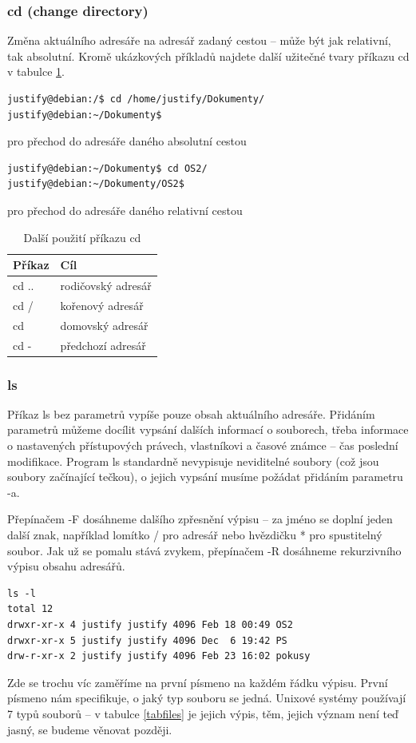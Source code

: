 \documentclass{article}
\begin{document}
\subsubsection{cd (change directory)}
Změna aktuálního adresáře na adresář zadaný cestou -- může být jak relativní, tak absolutní. Kromě ukázkových příkladů najdete další užitečné tvary příkazu cd v tabulce \ref{tabcd}.
\begin{verbatim}
justify@debian:/$ cd /home/justify/Dokumenty/
justify@debian:~/Dokumenty$
\end{verbatim}
pro přechod do adresáře daného absolutní cestou

\begin{verbatim}
justify@debian:~/Dokumenty$ cd OS2/
justify@debian:~/Dokumenty/OS2$
\end{verbatim}
pro přechod do adresáře daného relativní cestou
\begin{table}
\begin{center}
\begin{tabular}{l | l}
Příkaz & Cíl\\
\hline
cd .. & rodičovský adresář\\
cd / & kořenový adresář\\
cd & domovský adresář\\
cd - & předchozí adresář\\
\end{tabular}
\end{center}
\caption{Další použití příkazu cd}
\label{tabcd}
\end{table}

\subsubsection{ls}
Příkaz ls bez parametrů vypíše pouze obsah aktuálního adresáře. Přidáním parametrů můžeme docílit vypsání dalších informací o souborech, třeba informace o nastavených přístupových právech, vlastníkovi a časové známce -- čas poslední modifikace. Program ls standardně nevypisuje neviditelné soubory (což jsou soubory začínající tečkou), o jejich vypsání musíme požádat přidáním parametru -a. 

Přepínačem -F dosáhneme dalšího zpřesnění výpisu -- za jméno se doplní jeden další znak, například lomítko / pro adresář nebo hvězdičku * pro spustitelný soubor. Jak už se pomalu stává zvykem, přepínačem -R dosáhneme rekurzivního výpisu obsahu adresářů.

\begin{verbatim}
ls -l
total 12
drwxr-xr-x 4 justify justify 4096 Feb 18 00:49 OS2
drwxr-xr-x 5 justify justify 4096 Dec  6 19:42 PS
drw-r-xr-x 2 justify justify 4096 Feb 23 16:02 pokusy
\end{verbatim}
Zde se trochu víc zaměříme na první písmeno na každém řádku výpisu. První písmeno nám specifikuje, o jaký typ souboru se jedná. Unixové systémy používají 7 typů souborů -- v tabulce \ref{tabfiles} je jejich výpis, těm, jejich význam není teď jasný, se budeme věnovat později.
\end{document}
